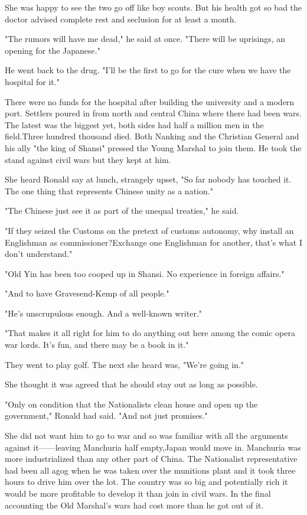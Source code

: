 \par She was happy to see the two go off like boy scouts. But his health got so bad the doctor advised complete rest and seclusion for at least a month.
\par "The rumors will have me dead," he said at once. "There will be uprisings, an opening for the Japanese."
\par He went back to the drug. "I'll be the first to go for the cure when we have the hospital for it."
\par There were no funds for the hospital after building the university and a modern port. Settlers poured in from north and central China where there had been wars. The latest was the biggest yet, both sides had half a million men in the field.Three hundred thousand died. Both Nanking and the Christian General and his ally "the king of Shansi" pressed the Young Marshal to join them. He took the stand against civil wars but they kept at him.
\par She heard Ronald say at lunch, strangely upset, "So far nobody has touched it. The one thing that represents Chinese unity as a nation."
\par "The Chinese just see it as part of the unequal treaties," he said.
\par "If they seized the Customs on the pretext of customs autonomy, why install an Englishman as commissioner?Exchange one Englishman for another, that's what I don't understand."
\par "Old Yin has been too cooped up in Shansi. No experience in foreign affairs."
\par "And to have Gravesend-Kemp of all people."
\par "He's unscrupulous enough. And a well-known writer."
\par "That makes it all right for him to do anything out here among the comic opera war lords. It's fun, and there may be a book in it."
\par They went to play golf. The next she heard was, "We're going in."
\par She thought it was agreed that he should stay out as long as possible.
\par "Only on condition that the Nationalists clean house and open up the government," Ronald had said. "And not just promises."
\par She did not want him to go to war and so was familiar with all the arguments against it——leaving Manchuria half empty,Japan would move in. Manchuria was more industrialized than any other part of China. The Nationalist representative had been all agog when he was taken over the munitions plant and it took three hours to drive him over the lot. The country was so big and potentially rich it would be more profitable to develop it than join in civil wars. In the final accounting the Old Marshal's wars had cost more than he got out of it.
